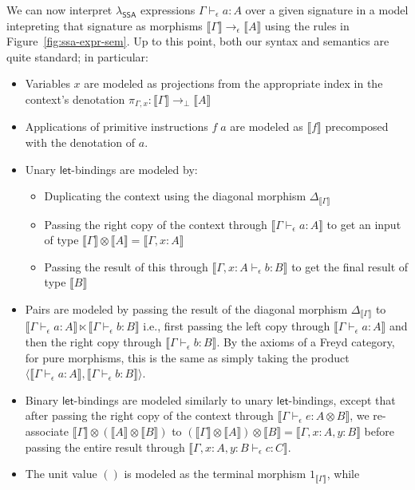 \documentclass[acmsmall,screen,review]{acmart}
\newcommand{\ms}[1]{\ensuremath{\mathsf{#1}}}
\newcommand{\bhyp}[2]{#1 : #2}
\newcommand{\hasty}[4]{#1 \vdash_{#2} #3: {#4}}
\newcommand{\dnt}[1]{\llbracket{#1}\rrbracket}
\newcommand{\isotopessa}{\(\lambda_{\ms{SSA}}\)}
\begin{document}
We can now interpret \isotopessa{} expressions $\hasty{\Gamma}{\epsilon}{a}{A}$ over a given
signature in a model intepreting that signature as morphisms $\dnt{\Gamma} \to_\epsilon \dnt{A}$
using the rules in Figure~\ref{fig:ssa-expr-sem}. Up to this point, both our syntax and semantics
are quite standard; in particular:
\begin{itemize}
  \item Variables $x$ are modeled as projections from the appropriate index in the context's
  denotation $\pi_{\Gamma, x} : \dnt{\Gamma} \to_\bot \dnt{A}$
  \item Applications of primitive instructions $f\;a$ are modeled as $\dnt{f}$ precomposed with the
  denotation of $a$. 
  \item Unary \ms{let}-bindings are modeled by:
  \begin{itemize}
    \item Duplicating the context using the diagonal morphism $\Delta_{\dnt{\Gamma}}$
    \item Passing the right copy of the context through $\dnt{\hasty{\Gamma}{\epsilon}{a}{A}}$ to
    get an input of type $\dnt{\Gamma} \otimes \dnt{A} = \dnt{\Gamma, \bhyp{x}{A}}$
    \item Passing the result of this through $\dnt{\hasty{\Gamma, \bhyp{x}{A}}{\epsilon}{b}{B}}$ to get
    the final result of type $\dnt{B}$
  \end{itemize}
  \item Pairs are modeled by passing the result of the diagonal morphism $\Delta_{\dnt{\Gamma}}$ to
   $
   \dnt{\hasty{\Gamma}{\epsilon}{a}{A}} \ltimes \dnt{\hasty{\Gamma}{\epsilon}{b}{B}}
   $
   i.e., first
   passing the left copy through $\dnt{\hasty{\Gamma}{\epsilon}{a}{A}}$ and then the right copy
   through $\dnt{\hasty{\Gamma}{\epsilon}{b}{B}}$. By the axioms of a Freyd category, for pure
   morphisms, this is the same as simply taking the product
   $
    \langle \dnt{\hasty{\Gamma}{\epsilon}{a}{A}}, \dnt{\hasty{\Gamma}{\epsilon}{b}{B}} \rangle
   $.
  \item Binary \ms{let}-bindings are modeled similarly to unary \ms{let}-bindings, except that after
  passing the right copy of the context through $\dnt{\hasty{\Gamma}{\epsilon}{e}{A \otimes B}}$, we
  re-associate $\dnt{\Gamma} \otimes (\dnt{A} \otimes \dnt{B})$ to $(\dnt{\Gamma} \otimes \dnt{A})
  \otimes \dnt{B} = \dnt{\Gamma, \bhyp{x}{A}, \bhyp{y}{B}}$ before passing the entire result through
  $\dnt{\hasty{\Gamma, \bhyp{x}{A}, \bhyp{y}{B}}{\epsilon}{c}{C}}$.
  \item The unit value $()$ is modeled as the terminal morphism $1_{\dnt{\Gamma}}$, while

\end{itemize}
\end{document}
